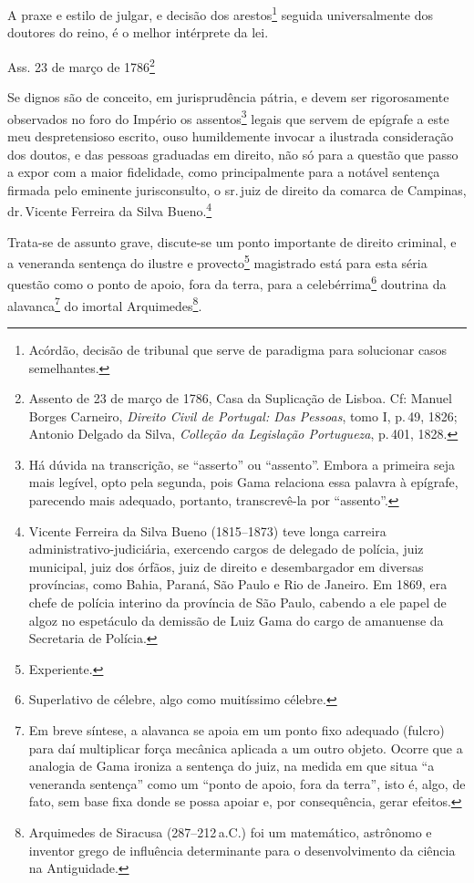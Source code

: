 A praxe e estilo de julgar, e decisão dos arestos\footnote{ Acórdão,
  decisão de tribunal que serve de paradigma para solucionar casos
  semelhantes.} seguida universalmente dos doutores do reino, é o melhor
intérprete da lei.

Ass. 23 de março de 1786\footnote{ Assento de 23 de março de 1786, Casa
  da Suplicação de Lisboa. Cf: Manuel Borges Carneiro, \emph{Direito
  Civil de Portugal: Das Pessoas}, tomo I, p.\,49, 1826; Antonio Delgado
  da Silva, \emph{Colleção da Legislação Portugueza}, p.\,401, 1828.}

Se dignos são de conceito, em jurisprudência pátria, e devem ser
rigorosamente observados no foro do Império os assentos\footnote{ Há
  dúvida na transcrição, se ``asserto'' ou ``assento''. Embora a primeira
  seja mais legível, opto pela segunda, pois Gama relaciona essa palavra
  à epígrafe, parecendo mais adequado, portanto, transcrevê-la por
  ``assento''.} legais que servem de epígrafe a este meu despretensioso
escrito, ouso humildemente invocar a ilustrada consideração dos doutos,
e das pessoas graduadas em direito, não só para a questão que passo a
expor com a maior fidelidade, como principalmente para a notável
sentença firmada pelo eminente jurisconsulto, o sr.\,juiz de direito da
comarca de Campinas, dr.\,Vicente Ferreira da Silva Bueno.\footnote{
  Vicente Ferreira da Silva Bueno (1815--1873) teve longa carreira
  administrativo-judiciária, exercendo cargos de delegado de polícia,
  juiz municipal, juiz dos órfãos, juiz de direito e desembargador em
  diversas províncias, como Bahia, Paraná, São Paulo e Rio de Janeiro.
  Em 1869, era chefe de polícia interino da província de São Paulo,
  cabendo a ele papel de algoz no espetáculo da demissão de Luiz Gama do
  cargo de amanuense da Secretaria de Polícia.}

Trata-se de assunto grave, discute-se um ponto importante de direito
criminal, e a veneranda sentença do ilustre e provecto\footnote{
  Experiente.} magistrado está para esta séria questão como o ponto de
apoio, fora da terra, para a celebérrima\footnote{ Superlativo de
  célebre, algo como muitíssimo célebre.} doutrina da
alavanca\footnote{ Em breve síntese, a alavanca se apoia em um ponto
  fixo adequado (fulcro) para daí multiplicar força mecânica aplicada a
  um outro objeto. Ocorre que a analogia de Gama ironiza a sentença do
  juiz, na medida em que situa ``a veneranda sentença'' como um ``ponto de
  apoio, fora da terra'', isto é, algo, de fato, sem base fixa donde se
  possa apoiar e, por consequência, gerar efeitos.} do imortal
Arquimedes\footnote{ Arquimedes de Siracusa (287--212\,a.C.) foi um
  matemático, astrônomo e inventor grego de influência determinante para
  o desenvolvimento da ciência na Antiguidade.}.

